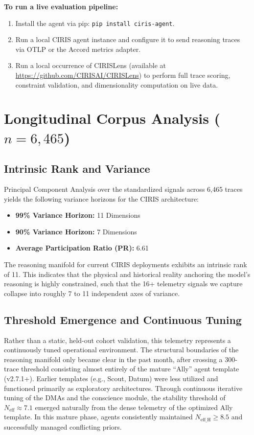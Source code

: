 \documentclass[11pt,a4paper]{article}
\begin{document}
\textbf{To run a live evaluation pipeline:}
\begin{enumerate}
    \item Install the agent via pip: \texttt{pip install ciris-agent}.
    \item Run a local CIRIS agent instance and configure it to send reasoning traces via OTLP or the Accord metrics adapter.
    \item Run a local occurrence of CIRISLens (available at \url{https://github.com/CIRISAI/CIRISLens}) to perform full trace scoring, constraint validation, and dimensionality computation on live data.
\end{enumerate}

\section{Longitudinal Corpus Analysis ($n=6,465$)}

\subsection{Intrinsic Rank and Variance}
Principal Component Analysis over the standardized signals across 6,465 traces yields the following variance horizons for the CIRIS architecture:
\begin{itemize}
    \item \textbf{99\% Variance Horizon:} 11 Dimensions
    \item \textbf{90\% Variance Horizon:} 7 Dimensions
    \item \textbf{Average Participation Ratio (PR):} 6.61
\end{itemize}
The reasoning manifold for current CIRIS deployments exhibits an intrinsic rank of 11. This indicates that the physical and historical reality anchoring the model's reasoning is highly constrained, such that the 16+ telemetry signals we capture collapse into roughly 7 to 11 independent axes of variance. 

\subsection{Threshold Emergence and Continuous Tuning}
Rather than a static, held-out cohort validation, this telemetry represents a continuously tuned operational environment. The structural boundaries of the reasoning manifold only became clear in the past month, after crossing a 300-trace threshold consisting almost entirely of the mature ``Ally'' agent template (v2.7.1+). Earlier templates (e.g., Scout, Datum) were less utilized and functioned primarily as exploratory architectures. Through continuous iterative tuning of the DMAs and the conscience module, the stability threshold of $N_{\text{eff}} \approx 7.1$ emerged naturally from the dense telemetry of the optimized Ally template. In this mature phase, agents consistently maintained $N_{\text{eff\_H}} \ge 8.5$ and successfully managed conflicting priors.
\end{document}

